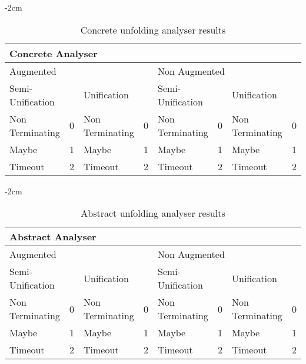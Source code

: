\begin{table}[ht]
    \centering
    \addtolength{\leftskip} {-2cm}
    \addtolength{\rightskip}{-2cm}

\begin{tabular}{|l|l|l|l|l|l|l|l|}
\hline
\multicolumn{8}{|l|}{Concrete Analyser} \\ \hline
\multicolumn{4}{|l|}{Augmented} & \multicolumn{4}{l|}{Non Augmented} \\ \hline
\multicolumn{2}{|l|}{Semi-Unification} & \multicolumn{2}{l|}{Unification} & \multicolumn{2}{l|}{Semi-Unification} & \multicolumn{2}{l|}{Unification} \\ \hline
Non Terminating & 0 & Non Terminating & 0 & Non Terminating & 0 & Non Terminating & 0 \\ \hline
Maybe & 1 & Maybe & 1 & Maybe & 1 & Maybe & 1 \\ \hline
Timeout & 2 & Timeout & 2 & Timeout & 2 & Timeout & 2 \\ \hline
\end{tabular}
    \caption{Concrete unfolding analyser results}
\label{tab:result:concrete}
\end{table}
\begin{table}[ht]
    \centering
    \addtolength{\leftskip} {-2cm}
    \addtolength{\rightskip}{-2cm}

\begin{tabular}{|l|l|l|l|l|l|l|l|}
\hline \multicolumn{8}{|l|}{Abstract Analyser} \\ \hline
\multicolumn{4}{|l|}{Augmented} & \multicolumn{4}{l|}{Non Augmented} \\ \hline
\multicolumn{2}{|l|}{Semi-Unification} & \multicolumn{2}{l|}{Unification} & \multicolumn{2}{l|}{Semi-Unification} & \multicolumn{2}{l|}{Unification} \\ \hline
Non Terminating & 0 & Non Terminating & 0 & Non Terminating & 0 & Non Terminating & 0 \\ \hline
Maybe & 1 & Maybe & 1 & Maybe & 1 & Maybe & 1 \\ \hline
Timeout & 2 & Timeout & 2 & Timeout & 2 & Timeout & 2 \\ \hline
\end{tabular}
    \caption{Abstract unfolding analyser results}
\label{tab:result:abstract}
\end{table}